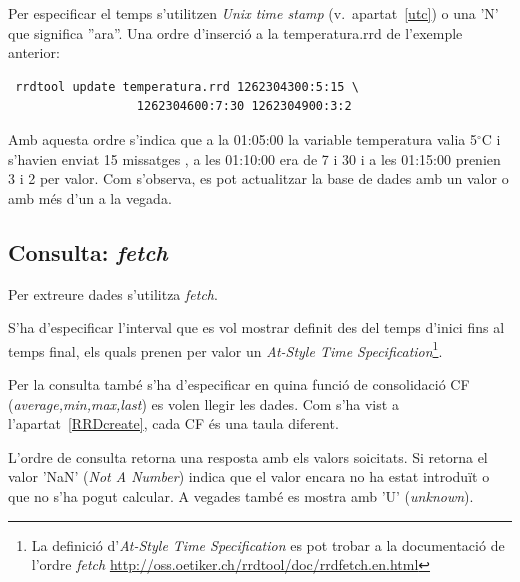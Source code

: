 Per especificar el temps s'utilitzen \emph{Unix time stamp} (v.\ apartat~\ref{utc})  o una 'N' que significa ''ara''. Una ordre d'inserció a la temperatura.rrd de l'exemple anterior:

\begin{verbatim}
 rrdtool update temperatura.rrd 1262304300:5:15 \
                  1262304600:7:30 1262304900:3:2
\end{verbatim}

Amb aquesta ordre s'indica que a la 01:05:00 la variable temperatura valia 5$^\circ$C i s'havien enviat 15 missatges , a les 01:10:00 era de 7 i 30 i a les 01:15:00 prenien 3 i 2 per valor. Com s'observa, es pot actualitzar la base de dades amb un valor o amb més d'un a la vegada.





\subsection{Consulta: \emph{fetch}}
\label{sec:rrdtool:fetch}

Per extreure dades s'utilitza \emph{fetch}. 


S'ha d'especificar l'interval que es vol mostrar definit des del temps d'inici fins al temps final, els quals prenen per valor un \emph{At-Style Time Specification}\footnote{La definició d'\emph{At-Style Time Specification} es pot trobar a la documentació de l'ordre \emph{fetch} \url{http://oss.oetiker.ch/rrdtool/doc/rrdfetch.en.html}}. 

Per la consulta també s'ha d'especificar en quina funció de consolidació CF (\emph{average,min,max,last}) es volen llegir les dades. Com s'ha vist a l'apartat~\ref{RRDcreate}, cada CF és una taula diferent.


L'ordre de consulta retorna una resposta amb els valors so\lgem icitats. Si retorna el valor 'NaN' (\emph{Not A Number}) indica que el valor encara no ha estat introduït o que no s'ha pogut calcular. A vegades també es mostra amb 'U' (\emph{unknown}).


